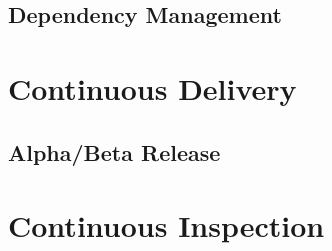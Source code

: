 \subsection{Dependency Management}

\section{Continuous Delivery}

\subsection{Alpha/Beta Release}

\section{Continuous Inspection}
